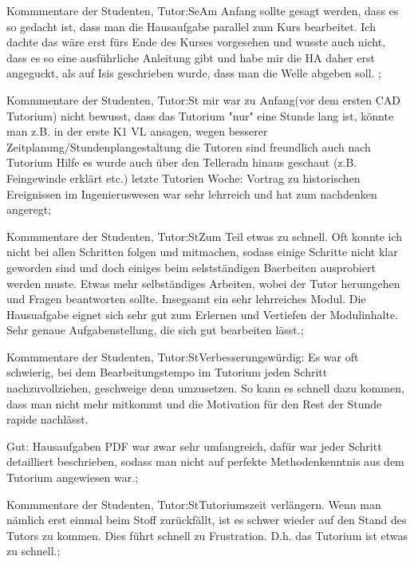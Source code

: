 \documentclass[10pt]{beamer}
\begin{document}
\begin{frame}[fragile]{Kommmentare der Studenten, Tutor:Se}Am Anfang sollte gesagt werden, dass es so gedacht ist, dass man die Hausaufgabe parallel zum Kurs bearbeitet. Ich dachte das wäre erst fürs Ende des Kurses vorgesehen und wusste auch nicht, dass es so eine ausführliche Anleitung gibt und habe mir die HA daher erst angeguckt, als auf Isis geschrieben wurde, dass man die Welle abgeben soll. ;
 \end{frame}
\begin{frame}[fragile]{Kommmentare der Studenten, Tutor:St}   mir war zu Anfang(vor dem ersten CAD Tutorium) nicht bewusst, dass das Tutorium "nur" eine Stunde lang ist, könnte man z.B. in der erste K1 VL ansagen, wegen besserer Zeitplanung/Stundenplangestaltung     die Tutoren sind freundlich   auch nach Tutorium Hilfe   es wurde auch über den Telleradn hinaus geschaut (z.B. Feingewinde erklärt etc.)   letzte Tutorien Woche: Vortrag zu historischen Ereignissen im Ingenieruswesen war sehr lehrreich und hat zum nachdenken angeregt;
 \end{frame}
\begin{frame}[fragile]{Kommmentare der Studenten, Tutor:St}Zum Teil etwas zu schnell. Oft konnte ich nicht bei allen Schritten folgen und mitmachen, sodass einige Schritte nicht klar geworden sind und doch einiges beim selstständigen Baerbeiten ausprobiert werden muste. Etwas mehr selbständiges Arbeiten, wobei der Tutor herumgehen und Fragen beantworten sollte. Insegsamt ein sehr lehrreiches Modul. Die Hausuafgabe eignet sich sehr gut zum Erlernen und Vertiefen der Modulinhalte. Sehr genaue Aufgabenstellung, die sich gut bearbeiten lässt.;
 \end{frame}
\begin{frame}[fragile]{Kommmentare der Studenten, Tutor:St}Verbesserungswürdig: Es war oft schwierig, bei dem Bearbeitungstempo im Tutorium jeden Schritt nachzuvollziehen, geschweige denn umzusetzen. So kann es schnell dazu kommen, dass man nicht mehr mitkommt und die Motivation für den Rest der Stunde rapide nachlässt.
 
 Gut: Hausaufgaben PDF war zwar sehr umfangreich, dafür war jeder Schritt detailliert beschrieben, sodass man nicht auf perfekte Methodenkenntnis aus dem Tutorium angewiesen war.;
 \end{frame}
\begin{frame}[fragile]{Kommmentare der Studenten, Tutor:St}Tutoriumszeit verlängern. Wenn man nämlich erst einmal beim Stoff zurückfällt, ist es schwer wieder auf den Stand des Tutors zu kommen. Dies führt schnell zu Frustration. D.h. das Tutorium ist etwas zu schnell.;
 \end{frame}
\end{document}
